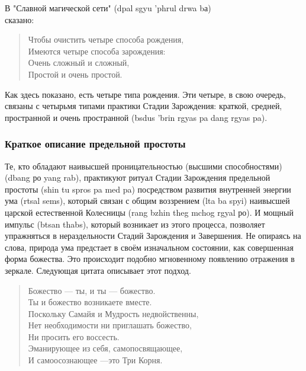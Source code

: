 В "Славной магической сети" (dpal sgyu 'phrul drwa bа)\\ сказано:\\

\begin{verse}
Чтобы очистить четыре способа рождения,\\
Имеются четыре способа зарождения:\\
Очень сложный и сложный,\\
Простой и очень простой.
\end{verse}

\begin{siderules}
Как здесь показано, есть четыре типа рождения. Эти четыре, в свою очередь, связаны с
четырьмя типами практики Стадии Зарождения: краткой, средней, простран\-ной и очень
пространной (bsdus 'brin rgyas pa dang rgyas pa).
\end{siderules}

\newpage
\subsubsection{Краткое описание предельной простоты}
\vspace{1cm}
Те, кто обладают наивысшей проницательностью (высшими способностями) (dbang ро
yang rab), практикуют ритуал Стадии Зарождения предельной простоты (shin tu spros pa med
pa) посредством развития внутренней энергии ума (rtsal sems), который связан с общим
воззрением (lta ba spyi) наивысшей царской естественной Колесницы (rang bzhin theg mchog
rgyal ро). И мощный импульс (btsan thabs), который возникает из этого процесса, позволяет
упражняться в нераздельности Стадий Зарождения и Завершения. Не опираясь на слова,
природа ума предстает в своём изначальном состоянии, как совершенная форма божества.
Это происходит подобно мгнове\-нному появлению отражения в зеркале. Следующая цитата
описывает этот подход.

\begin{verse}
Божество — ты, и ты — божество.\\
Ты и божество возникаете вместе.\\
Поскольку Самайя и Мудрость недвойственны,\\
Нет необходимости ни приглашать божество,\\
Ни просить его воссесть.\\
Эманирующее из себя, самопосвящающее,\\
И самоосознающее —это Три Корня.\\
\end{verse}

